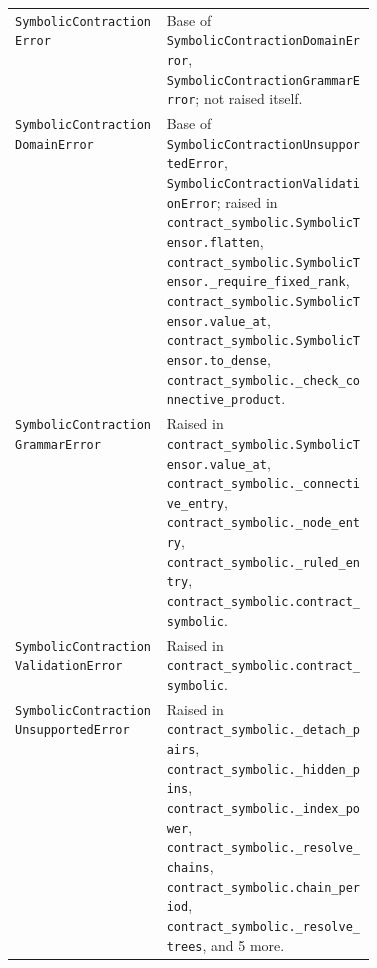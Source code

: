 {\begin{xltabular}{\linewidth}{@{}>{\raggedright\arraybackslash}p{0.42\linewidth}X@{}}
\texttt{SymbolicContractionError}\newline{} & Base of \texttt{SymbolicContractionDomainError}, \texttt{SymbolicContractionGrammarError}; not raised itself. \\
\texttt{SymbolicContractionDomainError}\newline{} & Base of \texttt{SymbolicContractionUnsupportedError}, \texttt{SymbolicContractionValidationError}; raised in \texttt{contract\_\allowbreak{}symbolic.\allowbreak{}SymbolicTensor.\allowbreak{}flatten}, \texttt{contract\_\allowbreak{}symbolic.\allowbreak{}SymbolicTensor.\allowbreak{}\_\allowbreak{}require\_\allowbreak{}fixed\_\allowbreak{}rank}, \texttt{contract\_\allowbreak{}symbolic.\allowbreak{}SymbolicTensor.\allowbreak{}value\_\allowbreak{}at}, \texttt{contract\_\allowbreak{}symbolic.\allowbreak{}SymbolicTensor.\allowbreak{}to\_\allowbreak{}dense}, \texttt{contract\_\allowbreak{}symbolic.\allowbreak{}\_\allowbreak{}check\_\allowbreak{}connective\_\allowbreak{}product}. \\
\texttt{SymbolicContractionGrammarError}\newline{} & Raised in \texttt{contract\_\allowbreak{}symbolic.\allowbreak{}SymbolicTensor.\allowbreak{}value\_\allowbreak{}at}, \texttt{contract\_\allowbreak{}symbolic.\allowbreak{}\_\allowbreak{}connective\_\allowbreak{}entry}, \texttt{contract\_\allowbreak{}symbolic.\allowbreak{}\_\allowbreak{}node\_\allowbreak{}entry}, \texttt{contract\_\allowbreak{}symbolic.\allowbreak{}\_\allowbreak{}ruled\_\allowbreak{}entry}, \texttt{contract\_\allowbreak{}symbolic.\allowbreak{}contract\_\allowbreak{}symbolic}. \\
\texttt{SymbolicContractionValidationError}\newline{} & Raised in \texttt{contract\_\allowbreak{}symbolic.\allowbreak{}contract\_\allowbreak{}symbolic}. \\
\texttt{SymbolicContractionUnsupportedError}\newline{} & Raised in \texttt{contract\_\allowbreak{}symbolic.\allowbreak{}\_\allowbreak{}detach\_\allowbreak{}pairs}, \texttt{contract\_\allowbreak{}symbolic.\allowbreak{}\_\allowbreak{}hidden\_\allowbreak{}pins}, \texttt{contract\_\allowbreak{}symbolic.\allowbreak{}\_\allowbreak{}index\_\allowbreak{}power}, \texttt{contract\_\allowbreak{}symbolic.\allowbreak{}\_\allowbreak{}resolve\_\allowbreak{}chains}, \texttt{contract\_\allowbreak{}symbolic.\allowbreak{}chain\_\allowbreak{}period}, \texttt{contract\_\allowbreak{}symbolic.\allowbreak{}\_\allowbreak{}resolve\_\allowbreak{}trees}, and 5 more. \\

\end{xltabular}}

